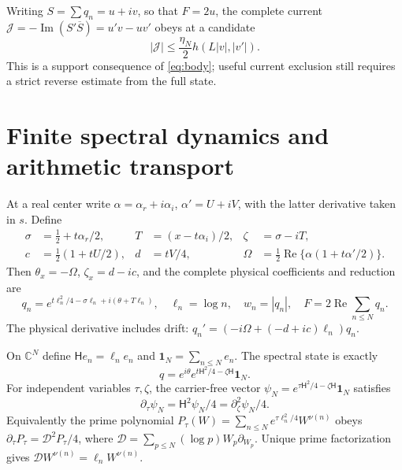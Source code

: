 \documentclass[11pt]{article}
\theoremstyle{definition}
\theoremstyle{remark}
\newcommand{\Rea}{\operatorname{Re}}
\newcommand{\Ima}{\operatorname{Im}}
\newcommand{\Hspec}{\mathsf H}
\newcommand{\one}{\mathbf1}
\begin{document}
Writing $S=\sum q_n=u+iv$, so that $F=2u$, the complete current
$\mathcal J=-\Ima(S'\overline S)=u'v-uv'$ obeys at a candidate
\begin{equation}
 |\mathcal J|\le\frac{\eta_N}{2}
                   h(L|v|,|v'|).
 \label{eq:current-support}
\end{equation}
This is a support consequence of \eqref{eq:body}; useful current
exclusion still requires a strict reverse estimate from the full state.

\section{Finite spectral dynamics and arithmetic transport}
\label{sec:finite}

At a real center write $\alpha=\alpha_r+i\alpha_i$,
$\alpha'=U+iV$, with the latter derivative taken in $s$. Define
\begin{align}
 \sigma&=\tfrac12+t\alpha_r/2,&T&=(x-t\alpha_i)/2,
 &\zeta&=\sigma-iT,\nonumber\\
 c&=\tfrac12(1+tU/2),&d&=tV/4,
 &\Omega&=\tfrac12\Rea\{\alpha(1+t\alpha'/2)\}.\label{eq:physical-data}
\end{align}
Then $\theta_x=-\Omega$, $\zeta_x=d-ic$, and the complete physical
coefficients and reduction are
\begin{equation}
 q_n=e^{t\ell_n^2/4-\sigma\ell_n+i(\theta+T\ell_n)},
 \quad\ell_n=\log n,\quad
 w_n=|q_n|,\quad F=2\Rea\sum_{n\le N}q_n.
 \label{eq:q}
\end{equation}
The physical derivative includes drift:
$q_n'=(-i\Omega+(-d+ic)\ell_n)q_n$.

On $\mathbb C^N$ define $\Hspec e_n=\ell_ne_n$ and
$\one_N=\sum_{n\le N}e_n$. The spectral state is exactly
\begin{equation}
 q=e^{i\theta}e^{t\Hspec^2/4-\zeta\Hspec}\one_N.
 \label{eq:state}
\end{equation}
For independent variables $\tau,\zeta$, the carrier-free vector
$\psi_N=e^{\tau\Hspec^2/4-\zeta\Hspec}\one_N$ satisfies
\begin{equation}
 \partial_\tau\psi_N=\Hspec^2\psi_N/4
                     =\partial_\zeta^2\psi_N/4.
 \label{eq:spectral-heat}
\end{equation}
Equivalently the prime polynomial
$P_\tau(W)=\sum_{n\le N}e^{\tau\ell_n^2/4}W^{\nu(n)}$ obeys
$\partial_\tau P_\tau=\mathcal D^2P_\tau/4$, where
$\mathcal D=\sum_{p\le N}(\log p)W_p\partial_{W_p}$.
Unique prime factorization gives $\mathcal DW^{\nu(n)}=\ell_nW^{\nu(n)}$.
\end{document}
